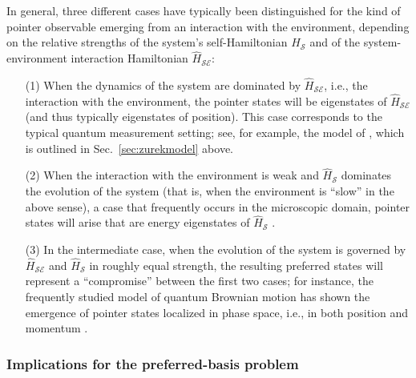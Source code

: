 \documentclass[twocolumn,rmp,aps,amsmath,amsfonts,noshowkeys,noshowpacs]{revtex4}
\begin{document}
In general, three different cases have typically been distinguished
\citep[for example, in][]{Paz:1999:vv} for the kind of pointer
observable emerging from an interaction with the environment,
depending on the relative strengths of the system's self-Hamiltonian
$\widehat{H}_{\mathcal{S}}$ and of the system-environment interaction
Hamiltonian $\widehat{H}_\mathcal{SE}$:
%
\begin{enumerate} 
  
\item[(1)] When the dynamics of the system are dominated by
  $\widehat{H}_\mathcal{SE}$, i.e., the interaction with the
  environment, the pointer states will be eigenstates of
  $\widehat{H}_\mathcal{SE}$ (and thus typically eigenstates of
  position). This case corresponds to the typical quantum measurement
  setting; see, for example, the model of
  \citet{Zurek:1981:dd,Zurek:1982:tv}, which is outlined in
  Sec.~\ref{sec:zurekmodel} above.
  
\item[(2)] When the interaction with the environment is weak and
  $\widehat{H}_\mathcal{S}$ dominates the evolution of the system
  (that is, when the environment is ``slow'' in the above sense), a
  case that frequently occurs in the microscopic domain, pointer
  states will arise that are energy eigenstates of
  $\widehat{H}_\mathcal{S}$ \citep{Paz:1999:vv}.
  
\item[(3)] In the intermediate case, when the evolution of the system is
  governed by $\widehat{H}_\mathcal{SE}$ and $\widehat{H}_\mathcal{S}$
  in roughly equal strength, the resulting preferred states will
  represent a ``compromise'' between the first two cases; for
  instance, the frequently studied model of quantum Brownian motion
  has shown the emergence of pointer states localized in phase space,
  i.e., in both position and momentum
  \citep{Zurek:1993:qq,Zurek:2002:ii,Joos:2003:jh,Unruh:1989:rc,Eisert:2003:ib}.
  
\end{enumerate}


\subsubsection{\label{sec:einsel-mp}Implications for the
  preferred-basis problem}
\end{document}
